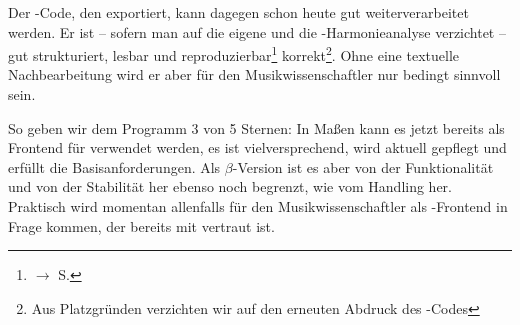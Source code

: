 Der -Code, den  exportiert, kann dagegen schon heute
gut weiterverarbeitet werden. Er ist -- sofern man auf die eigene und die
-Harmonieanalyse verzichtet -- gut strukturiert, lesbar und
reproduzierbar\footnote{$\rightarrow$ S.\pageref{ExportVerifikation}}
korrekt\footnote{Aus Platzgründen verzichten wir auf den erneuten Abdruck des
-Codes}. Ohne eine textuelle Nachbearbeitung wird er aber für den
Musikwissenschaftler nur bedingt sinnvoll sein.

So geben wir dem Programm 3 von 5 Sternen: In Maßen kann es jetzt bereits als
Frontend für  verwendet werden, es ist vielversprechend, wird aktuell
gepflegt und erfüllt die Basisanforderungen. Als $\beta$-Version ist es aber von
der Funktionalität und von der Stabilität her ebenso noch begrenzt, wie vom Handling
her. Praktisch wird  momentan allenfalls für den
Musikwissenschaftler als -Frontend in Frage kommen, der bereits mit
 vertraut ist.


%
